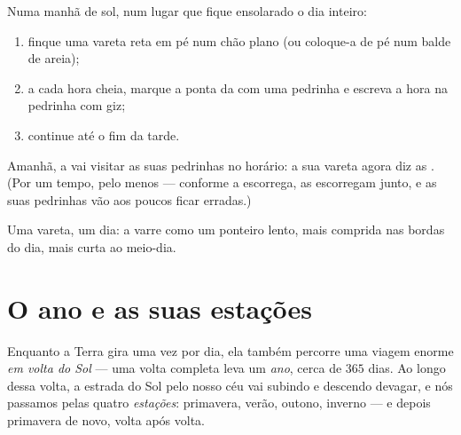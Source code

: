 \begin{method}\label{met:g3:sun-days-seasons:build}
Numa manhã de sol, num lugar que fique ensolarado o dia inteiro:
\begin{enumerate}
  \item finque uma vareta reta em pé num chão plano (ou coloque-a de
        pé num balde de areia);
  \item a cada hora cheia, marque a ponta da  com uma pedrinha
        e escreva a hora na pedrinha com giz;
  \item continue até o fim da tarde.
\end{enumerate}
Amanhã, a  vai visitar as suas pedrinhas no horário: a sua
vareta agora diz as . (Por um tempo, pelo menos --- conforme a
 escorrega, as  escorregam junto, e as suas pedrinhas
vão aos poucos ficar erradas.)
\end{method}

\begin{omfigure}

{\small Uma vareta, um dia: a  varre como um ponteiro lento,
mais comprida nas bordas do dia, mais curta ao meio-dia.}
\end{omfigure}

\section{O ano e as suas estações}

\begin{definition}\label{def:g3:sun-days-seasons:year}
Enquanto a Terra gira uma vez por dia, ela também percorre uma viagem
enorme \emph{em volta do Sol} --- uma volta completa leva um
\emph{ano}, cerca de $365$ dias. Ao longo dessa volta, a
estrada do Sol pelo nosso céu vai subindo e descendo devagar, e nós
passamos pelas quatro \emph{estações}: primavera,
verão, outono, inverno --- e depois primavera de novo, volta após
volta.
\end{definition}

